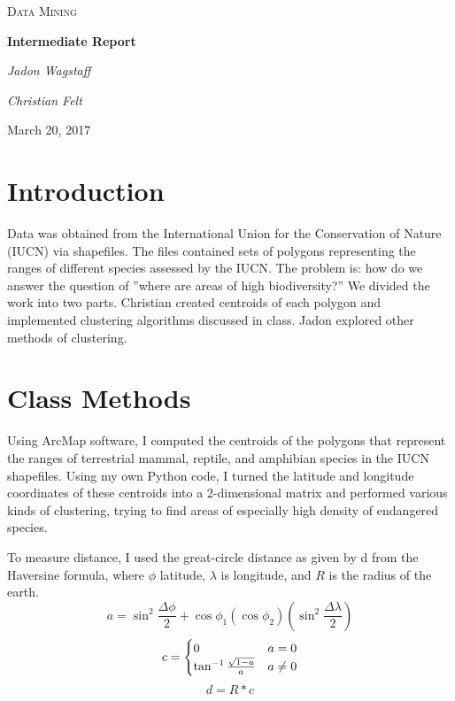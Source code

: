 \documentclass[12pt, fullpage,letterpaper]{article}
\begin{document}
	\begin{titlepage}
		\centering
		\vspace*{2cm}
		{\scshape\LARGE Data Mining\par}
		\vspace{.2cm}
		{\huge\bfseries Intermediate Report\par}
		\vspace{1cm}
		{\large\itshape Jadon Wagstaff\par}
		{\large\itshape Christian Felt\par}
		\vfill
		{\large March 20, 2017}
	\end{titlepage}
	
	\section{Introduction}
	Data was obtained from the International Union for the Conservation of Nature (IUCN) via shapefiles. The files contained sets of polygons representing the ranges of different species assessed by the IUCN. The problem is: how do we answer the question of ''where are areas of high biodiversity?'' We divided the work into two parts. Christian created centroids of each polygon and implemented clustering algorithms discussed in class. Jadon explored other methods of clustering.
	
	\section{Class Methods}
	Using ArcMap software, I computed the centroids of the polygons that represent the ranges of terrestrial mammal, reptile, and amphibian species in the IUCN shapefiles. Using my own Python code, I turned the latitude and longitude coordinates of these centroids into a 2-dimensional matrix and performed various kinds of clustering, trying to find areas of especially high density of endangered species.
	
	To measure distance, I used the great-circle distance as given by d from the Haversine formula, where $\phi$ latitude, $\lambda$ is longitude, and $R$ is the radius of the earth.
	\begin{equation}
		a = \sin^2 \frac{\Delta\phi}{2} + \cos \phi_1 (\cos \phi_2)  (\sin^2 \frac{\Delta\lambda}{2})
	\end{equation}
	\begin{equation}
		c =  \begin{cases} 
				0 & a = 0 \cr \tan^{-1}{\frac{\sqrt{1-a}}{a}} & a \neq 0
			\end{cases}
	\end{equation}
	\begin{equation}
		d = R*c
	\end{equation}
	
\end{document}
